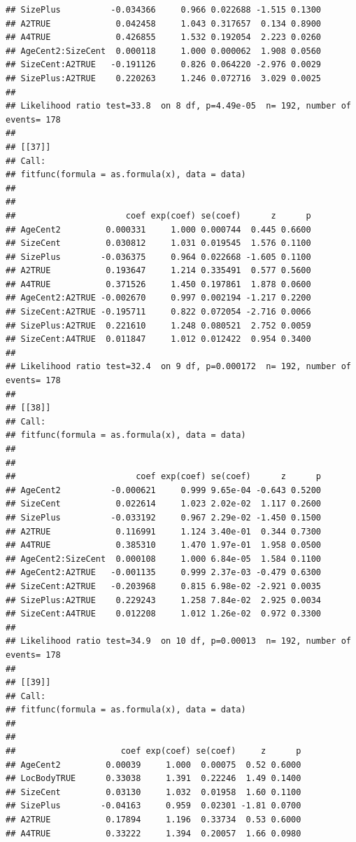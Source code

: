 \documentclass{article}\usepackage[]{graphicx}\usepackage[]{color}
\makeatletter
\newenvironment{kframe}{%
 \def\at@end@of@kframe{}%
 \ifinner\ifhmode%
  \def\at@end@of@kframe{\end{minipage}}%
  \begin{minipage}{\columnwidth}%
 \fi\fi%
 \def\FrameCommand##1{\hskip\@totalleftmargin \hskip-\fboxsep
 \colorbox{shadecolor}{##1}\hskip-\fboxsep
     \hskip-\linewidth \hskip-\@totalleftmargin \hskip\columnwidth}%
 \MakeFramed {\advance\hsize-\width
   \@totalleftmargin\z@ \linewidth\hsize
   \@setminipage}}%
 {\par\unskip\endMakeFramed%
 \at@end@of@kframe}
\newenvironment{knitrout}{}{} %
\makeatother
\begin{document}
\begin{knitrout}
\begin{kframe}
\begin{verbatim}
## SizePlus          -0.034366     0.966 0.022688 -1.515 0.1300
## A2TRUE             0.042458     1.043 0.317657  0.134 0.8900
## A4TRUE             0.426855     1.532 0.192054  2.223 0.0260
## AgeCent2:SizeCent  0.000118     1.000 0.000062  1.908 0.0560
## SizeCent:A2TRUE   -0.191126     0.826 0.064220 -2.976 0.0029
## SizePlus:A2TRUE    0.220263     1.246 0.072716  3.029 0.0025
## 
## Likelihood ratio test=33.8  on 8 df, p=4.49e-05  n= 192, number of events= 178 
## 
## [[37]]
## Call:
## fitfunc(formula = as.formula(x), data = data)
## 
## 
##                      coef exp(coef) se(coef)      z      p
## AgeCent2         0.000331     1.000 0.000744  0.445 0.6600
## SizeCent         0.030812     1.031 0.019545  1.576 0.1100
## SizePlus        -0.036375     0.964 0.022668 -1.605 0.1100
## A2TRUE           0.193647     1.214 0.335491  0.577 0.5600
## A4TRUE           0.371526     1.450 0.197861  1.878 0.0600
## AgeCent2:A2TRUE -0.002670     0.997 0.002194 -1.217 0.2200
## SizeCent:A2TRUE -0.195711     0.822 0.072054 -2.716 0.0066
## SizePlus:A2TRUE  0.221610     1.248 0.080521  2.752 0.0059
## SizeCent:A4TRUE  0.011847     1.012 0.012422  0.954 0.3400
## 
## Likelihood ratio test=32.4  on 9 df, p=0.000172  n= 192, number of events= 178 
## 
## [[38]]
## Call:
## fitfunc(formula = as.formula(x), data = data)
## 
## 
##                        coef exp(coef) se(coef)      z      p
## AgeCent2          -0.000621     0.999 9.65e-04 -0.643 0.5200
## SizeCent           0.022614     1.023 2.02e-02  1.117 0.2600
## SizePlus          -0.033192     0.967 2.29e-02 -1.450 0.1500
## A2TRUE             0.116991     1.124 3.40e-01  0.344 0.7300
## A4TRUE             0.385310     1.470 1.97e-01  1.958 0.0500
## AgeCent2:SizeCent  0.000108     1.000 6.84e-05  1.584 0.1100
## AgeCent2:A2TRUE   -0.001135     0.999 2.37e-03 -0.479 0.6300
## SizeCent:A2TRUE   -0.203968     0.815 6.98e-02 -2.921 0.0035
## SizePlus:A2TRUE    0.229243     1.258 7.84e-02  2.925 0.0034
## SizeCent:A4TRUE    0.012208     1.012 1.26e-02  0.972 0.3300
## 
## Likelihood ratio test=34.9  on 10 df, p=0.00013  n= 192, number of events= 178 
## 
## [[39]]
## Call:
## fitfunc(formula = as.formula(x), data = data)
## 
## 
##                     coef exp(coef) se(coef)     z      p
## AgeCent2         0.00039     1.000  0.00075  0.52 0.6000
## LocBodyTRUE      0.33038     1.391  0.22246  1.49 0.1400
## SizeCent         0.03130     1.032  0.01958  1.60 0.1100
## SizePlus        -0.04163     0.959  0.02301 -1.81 0.0700
## A2TRUE           0.17894     1.196  0.33734  0.53 0.6000
## A4TRUE           0.33222     1.394  0.20057  1.66 0.0980

\end{verbatim}
\end{kframe}
\end{knitrout}
\end{document}
